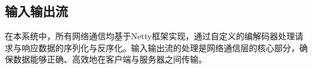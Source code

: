 \subsection{输入输出流}
在本系统中，所有网络通信均基于Netty框架实现，通过自定义的编解码器处理请求与响应数据的序列化与反序化。输入输出流的处理是网络通信层的核心部分，确保数据能够正确、高效地在客户端与服务器之间传输。

\begin{comment}
\subsubsection{读取输入}
Netty通过ChannelPipeline机制对输入流进行处理。服务器启动时，我们在Pipeline中配置了自定义的处理器，主要包括：
\begin{enumerate}
    \item \textbf{JsonObjectDecoder：}用于将接收到的字节流按JSON格式进行解码，解析为可操作的Java对象
    \item \textbf{NettyHandler：}继承自ChannelInboundHandlerAdapter，负责处理解码后的请求对象。在其channelRead方法中，我们对请求进行路由匹配、权限校验，并调用相应的业务逻辑处理单元。
\end{enumerate}
以下为主要处理流程的处理代码：
\begin{lstlisting}
EventLoopGroup bossGroup = new NioEventLoopGroup();
EventLoopGroup workerGroup = new NioEventLoopGroup();
try {
    ServerBootstrap b = new ServerBootstrap();
    b.group(bossGroup, workerGroup)
        .channel(NioServerSocketChannel.class)
        .childHandler(new ChannelInitializer<SocketChannel>() {
            @Override
            public void initChannel(@NonNull SocketChannel ch) {
                ch.pipeline().addLast(new JsonObjectDecoder())
                            .addLast(new NettyHandler(router));
            }
        })
        .option(ChannelOption.SO_BACKLOG, 128)
        .childOption(ChannelOption.SO_KEEPALIVE, true);
    ChannelFuture f = b.bind(port).sync();
    f.channel().closeFuture().sync();
} finally {
    workerGroup.shutdownGracefully();
    bossGroup.shutdownGracefully();
}
\end{lstlisting}
在NettyHandler的channelRead方法中，我们对请求对象进行进一步处理，包括路由查找、会话管理和权限判断，最终将请求分发给相应的Controller进行处理，并生成响应结果。

\subsubsection{发送输出}
处理完成后，服务器通过ChannelHandlerContext将响应对象写回客户端。我们使用Gson将Response对象序列化为JSON字符串，再通过Netty的Channel写入通道，最终发送至客户端。关键发送代码如下：
\begin{lstlisting}
    private void sendResponse(ChannelHandlerContext ctx, Response response) {
    ctx.writeAndFlush(Unpooled.copiedBuffer(gson.toJson(response), CharsetUtil.UTF_8));
}
\end{lstlisting}
该过程可确保响应数据以UTF-8编码的JSON格式通过网络传回客户端，从而最终完成一次完整的请求-响应交互。
\end{comment}
